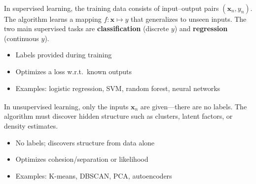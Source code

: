 \begin{tcbitemize}[ skin=sectionraster ]
    \tcbitem[title=Supervised Learning, raster multicolumn=3]
    In supervised learning, the training data consists of input--output pairs $(\mathbf{x}_n, y_n)$\textsuperscript{\cite[][pp.~8--12]{iiiCourseMachineLearning}}.
    The algorithm learns a mapping $f: \mathbf{x} \mapsto y$ that generalizes to unseen inputs.
    The two main supervised tasks are \textbf{classification} (discrete $y$) and \textbf{regression} (continuous $y$).
    \tcblower
    \begin{itemize}
        \item Labels provided during training
        \item Optimizes a loss w.r.t.\ known outputs
        \item Examples: logistic regression, SVM, random forest, neural networks
    \end{itemize}

    \tcbitem[title=Unsupervised Learning, raster multicolumn=3]
    In unsupervised learning, only the inputs $\mathbf{x}_n$ are given---there are no labels\textsuperscript{\cite[][p.~166]{iiiCourseMachineLearning}}.
    The algorithm must discover hidden structure such as clusters, latent factors, or density estimates.
    \tcblower
    \begin{itemize}
        \item No labels; discovers structure from data alone
        \item Optimizes cohesion/separation or likelihood
        \item Examples: K-means, DBSCAN, PCA, autoencoders
    \end{itemize}


\end{tcbitemize}
